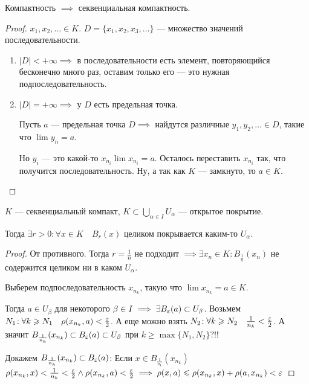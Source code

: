 \begin{consequence}
    Компактность $\implies$ секвенциальная компактность. 
\end{consequence}
\begin{proof}
    $x_1, x_2, \ldots \in K$. $D = \{ x_1, x_2, x_3,\ldots\}$ --- множество значений последовательности. 

    \begin{enumerate}
        \item $|D| < +\infty \implies$ в последовательности есть элемент, повторяющийся бесконечно много раз, оставим только его --- это нужная подпоследовательность.
        \item $|D| = +\infty \implies$ у  $D$ есть предельная точка.

            Пусть  $a$ --- предельная точка  $D \implies$ найдутся различные $y_1, y_2, \ldots \in D$, такие что $\lim y_n = a$. 

            Но $y_i$ --- это какой-то  $x_{n_i} \lim x_{n_i} = a$. Осталось переставить  $x_{n_i}$ так, что получится последовательность. Ну, а так как  $K$ --- замкнуто, то  $a \in K$.
    \end{enumerate}
\end{proof}
\begin{lemma}
    $K$ --- секвенциальный компакт,  $K \subset \bigcup\limits_{\alpha \in I} U_\alpha$ --- открытое покрытие.

    Тогда  $\exists r > 0\!: \forall x \in K\quad B_r(x)$ целиком покрывается каким-то  $U_\alpha$.
\end{lemma}
\begin{proof}
    От противного. Тогда $r = \frac{1}{n}$ не подходит $\implies \exists x_n \in K\!: B_{\frac{1}{n}}(x_n)$ не содержится целиком ни в каком $U_\alpha$.

    Выберем подпоследовательность $x_{n_k}$, такую что  $\lim x_{n_k} = a \in K$.

    Тогда  $a \in U_\beta$ для некоторого  $\beta \in I \implies \exists B_\varepsilon(a) \subset U_\beta$. Возьмем  $N_1\!: \forall k \geqslant N_1\quad \rho(x_{n_k}, a) < \frac{\varepsilon}{2}$. А еще можно взять $N_2\!: \forall k \geqslant N_2\quad \frac{1}{n_k} < \frac{\varepsilon}{2}$. А значит $B_{\frac{1}{n_{k}}}(x_{n_k}) \subset B_\varepsilon(a) \subset U_\beta$ при $k \ge \max\{N_1, N_2\}$?!!

    Докажем $B_{\frac{1}{n_{k}}}(x_{n_k}) \subset B_\varepsilon(a)$: Если $x \in B_{\frac{1}{n_k}}(x_{n_k})$  $\rho(x_{n_k}, x) < \frac{1}{n_k} < \frac{\varepsilon}{2} \land \rho(x_{n_k}, a) < \frac{\varepsilon}{2} \implies \rho(x, a) \leqslant \rho(x_{n_k}, x) + \rho(a, x_{n_k}) < \varepsilon$ 
\end{proof}
